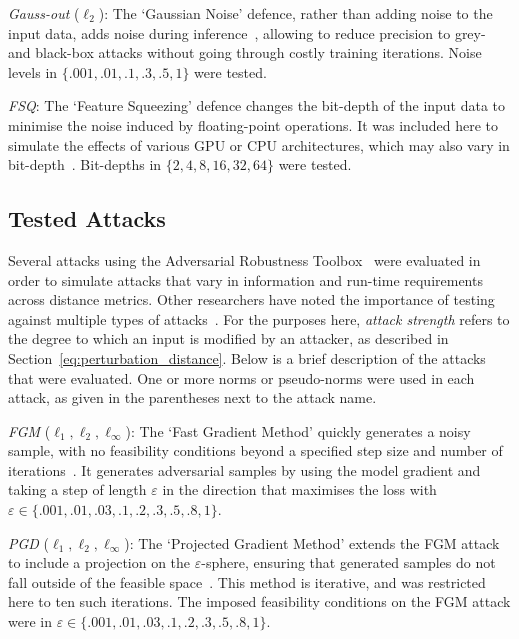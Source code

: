\textit{Gauss-out} ($\ell_2$): The `Gaussian Noise' defence, rather than adding noise to the input data, adds noise during inference~\cite{gauss_out}, allowing to reduce precision to grey- and black-box attacks without going through costly training iterations. 
Noise levels in $\{.001, .01, .1, .3, .5, 1\}$ were tested.


\textit{FSQ}: The `Feature Squeezing' defence changes the bit-depth of the input data to minimise the noise induced by floating-point operations. 
It was included here to simulate the effects of various GPU or CPU architectures, which may also vary in bit-depth~\cite{feature_squeezing}. 
Bit-depths in $\{2, 4, 8, 16, 32, 64\}$ were tested.



\subsection{Tested Attacks}
\label{attacks}

Several attacks using the Adversarial Robustness Toolbox~\cite{art2018} were evaluated in order to simulate attacks that vary in information and run-time requirements across distance metrics. 
Other researchers have noted the importance of testing against multiple types of attacks~\cite{carlini_towards_2017}. 
For the purposes here, \textit{attack strength} refers to the degree to which an input is modified by an attacker, as described in Section~\ref{eq:perturbation_distance}. 
Below is a brief description of the attacks that were evaluated. 
One or more norms or pseudo-norms were used in each attack, as given in the parentheses next to the attack name. 


\textit{FGM} ($\ell_1, \ell_2, \ell_{\infty}$): The `Fast Gradient Method' quickly generates a noisy sample, with no feasibility conditions beyond a specified step size and number of iterations~\cite{fgm}. 
It generates adversarial samples by using the model gradient and taking a step of length $\varepsilon$ in the direction that maximises the loss with $\varepsilon \in \{.001,.01,.03,.1,.2,.3,.5,.8,1\}$.


\textit{PGD}  ($\ell_1, \ell_2, \ell_{\infty}$): The `Projected Gradient Method' extends the FGM attack to include a projection on the $\varepsilon$-sphere, ensuring that generated samples do not fall outside of the feasible space~\cite{madry2017towards}. 
This method is iterative, and was restricted here to ten such iterations. The imposed feasibility conditions on the FGM attack were in $\varepsilon \in \{.001,.01,.03,.1,.2,.3,.5,.8,1\}$.


